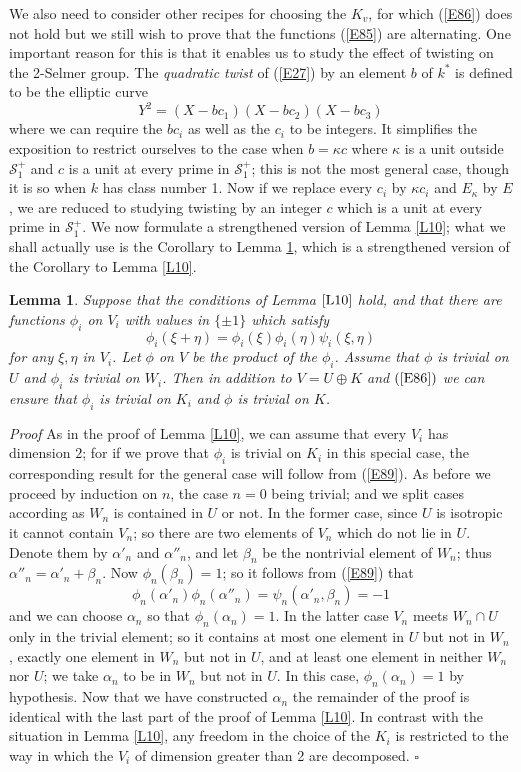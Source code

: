 \documentclass[12pt]{article}
\def\ga{{\alpha}}
\def\gb{{\beta}}
\def\gk{{\kappa}}
\def\sS{{\mathcal S}}
\def\qed{{\hfill$\square$}}
\def\beq{\begin{equation} \label}
\def\ble{\begin{lemma} \label}
\def\ele{\end{lemma}}
\newtheorem{lemma}{Lemma}
\begin{document}
We also need to consider
other recipes for choosing the $K_v$, for which (\ref{E86})
does not hold but we still wish to prove that the functions
(\ref{E85}) are alternating.
One important reason for this is that it enables us to study
the effect of twisting on the 2-Selmer group. The
\emph{quadratic twist} of (\ref{E27}) by an element $b$
of $k^*$ is defined to be the elliptic curve
\[ Y^2=(X-bc_1)(X-bc_2)(X-bc_3) \]
where we can require the $bc_i$ as well as the $c_i$ to be
integers. It simplifies the exposition to restrict ourselves
to the case when $b=\gk c$ where $\gk$ is a unit outside
$\sS^+_1$ and $c$ is a unit at every prime in $\sS^+_1$; this
is not the most general case, though it is so when
$k$ has class number 1. Now if we replace every $c_i$ by $\gk
c_i$ and $E_\gk$ by $E$, we are reduced to studying twisting
by an integer $c$ which is a unit at every prime in $\sS^+_1$.
We now formulate a strengthened version of Lemma \ref{L10};
what we shall actually use is the Corollary to Lemma \ref{L12},
which is a strengthened version of the Corollary to Lemma
\ref{L10}.
\ble{L12} Suppose that the conditions of Lemma $\ref{L10}$
hold, and that there are functions
$\phi_i$ on $V_i$ with values in $\{\pm1\}$ which satisfy
\beq{E89} \phi_i(\xi+\eta)=\phi_i(\xi)\phi_i(\eta)\psi_i(\xi,\eta)
\end{equation}
for any $\xi,\eta$ in $V_i$. Let $\phi$ on $V$ be
the product of the $\phi_i$.
Assume that $\phi$ is trivial on $U$ and $\phi_i$ is trivial on
$W_i$. Then in addition to $V=U\oplus K$ and $(\ref{E86})$
we can ensure that $\phi_i$ is trivial on
$K_i$ and $\phi$ is trivial on $K$.
\ele
\emph{Proof} As in the proof of Lemma \ref{L10}, we can
assume that every $V_i$ has dimension $2$; for if we prove
that $\phi_i$ is trivial on $K_i$ in this special case, the
corresponding result for the general case will follow from
(\ref{E89}). As before we proceed by induction on $n$, the
case $n=0$ being trivial; and we split cases according as
$W_n$ is contained in $U$ or not. In the former case, since
$U$ is isotropic it cannot contain $V_n$; so there are two
elements of $V_n$ which do not lie in
$U$. Denote them by $\ga'_n$ and $\ga''_n$, and let $\gb_n$ be
the nontrivial element of $W_n$; thus $\ga''_n=\ga'_n+\gb_n$.
Now $\phi_n(\gb_n)=1$; so it follows from (\ref{E89}) that
\[ \phi_n(\ga'_n)\phi_n(\ga''_n)=\psi_n(\ga'_n,\gb_n)=-1 \]
and we can choose $\ga_n$ so that $\phi_n(\ga_n)=1$.
In the latter case $V_n$ meets $W_n\cap U$ only in the trivial
element; so it contains at
most one element in $U$ but not in $W_n$, exactly one element
in $W_n$ but not in $U$,
and at least one element in neither $W_n$ nor $U$; we
take $\ga_n$ to be in $W_n$ but not in $U$. In this case,
$\phi_n(\ga_n)=1$ by hypothesis.
Now that we have constructed $\ga_n$ the remainder of the
proof is identical with the last part of the proof of Lemma
\ref{L10}.
In contrast with the situation in Lemma \ref{L10}, any
freedom in the choice of the $K_i$ is restricted to the
way in which the $V_i$ of dimension greater than 2 are
decomposed.  \qed
\end{document}
